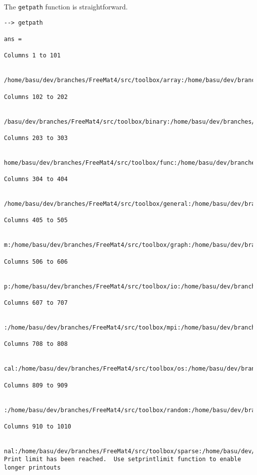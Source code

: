 The \verb|getpath| function is straightforward.
\begin{verbatim}
--> getpath

ans = 
 
Columns 1 to 101

 /home/basu/dev/branches/FreeMat4/src/toolbox/array:/home/basu/dev/branches/FreeMat4/src/toolbox:/home
 
Columns 102 to 202

 /basu/dev/branches/FreeMat4/src/toolbox/binary:/home/basu/dev/branches/FreeMat4/src/toolbox/fitting:/
 
Columns 203 to 303

 home/basu/dev/branches/FreeMat4/src/toolbox/func:/home/basu/dev/branches/FreeMat4/src/toolbox/funfun:
 
Columns 304 to 404

 /home/basu/dev/branches/FreeMat4/src/toolbox/general:/home/basu/dev/branches/FreeMat4/src/toolbox/geo
 
Columns 405 to 505

 m:/home/basu/dev/branches/FreeMat4/src/toolbox/graph:/home/basu/dev/branches/FreeMat4/src/toolbox/hel
 
Columns 506 to 606

 p:/home/basu/dev/branches/FreeMat4/src/toolbox/io:/home/basu/dev/branches/FreeMat4/src/toolbox/matrix
 
Columns 607 to 707

 :/home/basu/dev/branches/FreeMat4/src/toolbox/mpi:/home/basu/dev/branches/FreeMat4/src/toolbox/numeri
 
Columns 708 to 808

 cal:/home/basu/dev/branches/FreeMat4/src/toolbox/os:/home/basu/dev/branches/FreeMat4/src/toolbox/poly
 
Columns 809 to 909

 :/home/basu/dev/branches/FreeMat4/src/toolbox/random:/home/basu/dev/branches/FreeMat4/src/toolbox/sig
 
Columns 910 to 1010

 nal:/home/basu/dev/branches/FreeMat4/src/toolbox/sparse:/home/basu/dev/branches/FreeMat4/sr
Print limit has been reached.  Use setprintlimit function to enable longer printouts
\end{verbatim}
